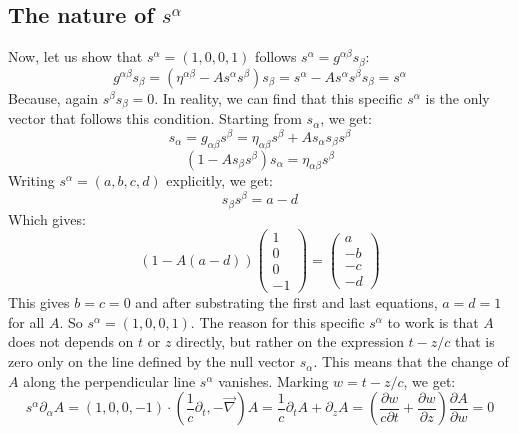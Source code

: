\documentclass{article}
\begin{document}
\subsection{The nature of $s^\alpha$}
Now, let us show that $s^\alpha = (1, 0, 0, 1)$ follows $s^\alpha = g^{\alpha\beta}s_{\beta}$:
\begin{equation}
    g^{\alpha\beta}s_{\beta} = \left(\eta^{\alpha\beta} - A s^\alpha s^\beta\right)s_\beta = s^\alpha - A s^\alpha s^\beta s_\beta = s^\alpha
\end{equation}
Because, again $s^\beta s_\beta = 0$. In reality, we can find that this specific $s^\alpha$ is the only vector that follows this condition. Starting from $s_\alpha$, we get:
\begin{equation}
    s_\alpha = g_{\alpha\beta}s^{\beta} = \eta_{\alpha\beta} s^\beta + A s_{\alpha} s_{\beta} s^{\beta}
\end{equation}
\begin{equation}
    \left(1 - A s_\beta s^\beta \right)s_\alpha = \eta_{\alpha\beta} s^\beta
\end{equation}
Writing $s^\alpha = (a, b, c, d)$ explicitly, we get:
\begin{equation}
    s_\beta s^\beta = a - d
\end{equation} 
Which gives:
\begin{equation}
    \left(1 - A(a - d)\right)\begin{pmatrix}
        1 \\ 0 \\ 0 \\ -1
    \end{pmatrix} = \begin{pmatrix}
        a \\ -b \\ -c \\ -d
    \end{pmatrix}
\end{equation}
This gives $b = c = 0$ and after substrating the first and last equations, $a = d = 1$ for all $A$. So $s^{\alpha} = (1, 0, 0, 1)$.
\newline
The reason for this specific $s^\alpha$ to work is that $A$ does not depends on $t$ or $z$ directly, but rather on the expression $t - z/c$ that is zero only on the line defined by the null vector $s_\alpha$. This means that the change of $A$ along the perpendicular line $s^\alpha$ vanishes. Marking $w = t - z/c$, we get:
\begin{equation}
    s^\alpha \partial_\alpha A = (1,0,0,-1)\cdot\left(\frac{1}{c}\partial_t, -\vec{\nabla}\right)A = \frac{1}{c}\partial_t A + \partial_z A = \left(\frac{\partial w}{c\partial t} + \frac{\partial w}{\partial z}\right)\frac{\partial A}{\partial w} = 0
\end{equation}
\end{document}

